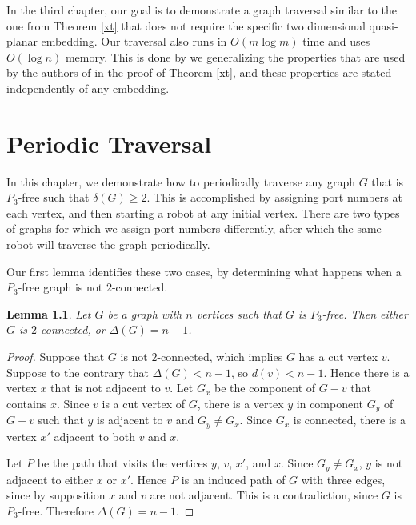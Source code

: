 \documentclass[12pt,letterpaper,oneside]{book}
\newtheorem{lemma}[theorem]{Lemma}
\begin{document}
In the third chapter, our goal is to demonstrate a graph traversal 
similar to the one from Theorem \ref{xt} that does not require the specific two dimensional quasi-planar embedding.  Our traversal 
also runs in $O(m\log m)$ time and uses $O(\log n)$ memory.  
This is done by we generalizing the properties that are used by the authors of \cite{CDKOSU} in the proof of Theorem \ref{xt}, and 
these properties are stated independently of any embedding.  


\chapter{Periodic Traversal}



In this chapter, we 
demonstrate how to periodically traverse any graph $G$ that is $P_3$-free such that $\delta(G)\ge 2$.  This is accomplished by assigning 
port numbers at each vertex, and then starting a robot at any initial vertex.  There are two types of graphs for which we assign port numbers 
differently, after which the same robot will traverse the graph periodically.  


Our first lemma identifies these two cases, by determining 
what happens when a $P_3$-free graph is not $2$-connected.  

\begin{lemma}\label{lemclass}
Let $G$ be a graph with $n$ vertices such that $G$ is $P_3$-free.  Then either $G$ is $2$-connected, or 
$\Delta(G)=n-1$.
\end{lemma}
\begin{proof}
Suppose that $G$ is not $2$-connected, which implies $G$ has a cut vertex $v$.  Suppose to the contrary that $\Delta(G)<n-1$, so 
$d(v)< n-1$.  Hence there is a vertex $x$ that is not adjacent to $v$.  Let $G_x$ be the component of $G-v$ that contains $x$.  Since 
$v$ is a cut vertex of $G$, there is a vertex $y$ in component $G_y$ of $G-v$ such that $y$ is adjacent to $v$ and $G_y\ne G_x$.  
Since $G_x$ is connected, there is a vertex $x'$ adjacent to both $v$ and $x$.  

Let $P$ be the path that visits 
the vertices $y$, $v$, $x'$, and $x$.  Since $G_y\ne G_x$, $y$ is not adjacent to either $x$ or $x'$.  Hence $P$ is an induced 
path of $G$ with three edges, since by supposition $x$ and $v$ are not adjacent.  This is a contradiction, since $G$ is $P_3$-free.  
Therefore $\Delta(G)=n-1$.  
\end{proof}
\end{document}
